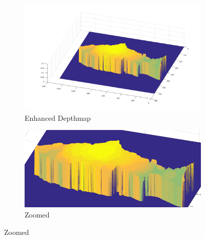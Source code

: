 \begin{figure}[H]
    \medskip
    \begin{subfigure}{0.41\textwidth}
        \includegraphics[width=\linewidth]{images/results/3D_plots/fixed_3D_87}
        \caption{Enhanced Depthmap}
    \end{subfigure}\hspace*{\fill}
    \begin{subfigure}{0.57\textwidth}
        \includegraphics[width=\linewidth]{images/results/3D_plots/zoomed_fixed_3D_87}
        \caption{Zoomed}
    \end{subfigure}
    

\end{figure}
